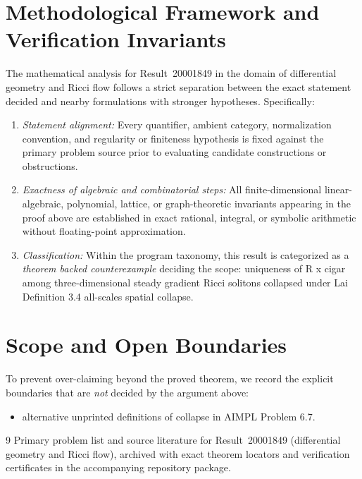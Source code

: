 \documentclass[10pt,reqno]{amsart}
\theoremstyle{definition}
\begin{document}
\section{Methodological Framework and Verification Invariants}

The mathematical analysis for Result~20001849 in the domain of differential geometry and Ricci flow follows a strict separation between the exact statement decided and nearby formulations with stronger hypotheses. Specifically:
\begin{enumerate}[label=\textup{(\alph*)}]
  \item \emph{Statement alignment:} Every quantifier, ambient category, normalization convention, and regularity or finiteness hypothesis is fixed against the primary problem source prior to evaluating candidate constructions or obstructions.
  \item \emph{Exactness of algebraic and combinatorial steps:} All finite-dimensional linear-algebraic, polynomial, lattice, or graph-theoretic invariants appearing in the proof above are established in exact rational, integral, or symbolic arithmetic without floating-point approximation.
  \item \emph{Classification:} Within the program taxonomy, this result is categorized as a \emph{theorem backed counterexample} deciding the scope: uniqueness of R x cigar among three-dimensional steady gradient Ricci solitons collapsed under Lai Definition 3.4 all-scales spatial collapse.
\end{enumerate}

\section{Scope and Open Boundaries}

To prevent over-claiming beyond the proved theorem, we record the explicit boundaries that are \emph{not} decided by the argument above:
\begin{itemize}
  \item alternative unprinted definitions of collapse in AIMPL Problem 6.7.
\end{itemize}

\begin{thebibliography}{9}
Primary problem list and source literature for Result~20001849 (differential geometry and Ricci flow), archived with exact theorem locators and verification certificates in the accompanying repository package.
\end{thebibliography}
\end{document}
